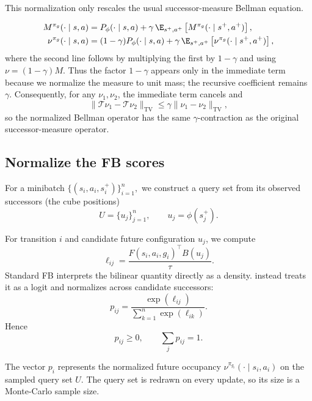 This normalization only rescales the usual successor-measure Bellman equation.

\begin{align}
    M^{\pi_g}(\cdot\mid s,a)    &= P_\phi(\cdot\mid s,a) + \gamma\,\E_{s^+,a^+} \left[ M^{\pi_g}(\cdot\mid s^+,a^+) \right], \\
    \nu^{\pi_g}(\cdot\mid s,a)  &= (1-\gamma)P_\phi(\cdot\mid s,a) + \gamma\,\E_{s^+,a^+} \left[ \nu^{\pi_g}(\cdot\mid s^+,a^+) \right],
\label{eq:normalized-bellman}
\end{align}
where the second line follows by multiplying the first by $1-\gamma$ and using $\nu=(1-\gamma)M$.
Thus the factor $1-\gamma$ appears only in the immediate term because we normalize the measure to unit mass; the recursive coefficient remains $\gamma$.
Consequently, for any $\nu_1,\nu_2$, the immediate term cancels and
\begin{equation}
    \|\mathcal T\nu_1-\mathcal T\nu_2\|_{\mathrm{TV}} \le \gamma\|\nu_1-\nu_2\|_{\mathrm{TV}},
\end{equation}
so the normalized Bellman operator has the same $\gamma$-contraction as the original successor-measure operator.

\subsection{Normalize the FB scores}

For a minibatch $\{(s_i,a_i,s_i^+)\}_{i=1}^n,$ we construct a query set from its observed successors (the cube positions)
\begin{equation}
U = \{u_j\}_{j=1}^n, \qquad u_j=\phi(s_j^+).
\end{equation}

For transition $i$ and candidate future configuration $u_j$, we compute
\begin{equation}
\ell_{ij} = \frac{ F(s_i,a_i,g_i)^\top B(u_j) }{\tau}.
\end{equation}
Standard FB interprets the bilinear quantity directly as a density.
\DensityFB{} instead treats it as a logit and normalizes across candidate successors:
\begin{equation}
\label{eq:density-softmax}
p_{ij} = \frac{ \exp(\ell_{ij}) }{ \sum_{k=1}^n \exp(\ell_{ik})}.
\end{equation}
Hence
\begin{equation}
p_{ij}\ge0, \qquad \sum_j p_{ij}=1.
\end{equation}

The vector $p_i$ represents the normalized future occupancy
$\nu^{\pi_{g_i}}(\cdot\mid s_i,a_i)$ on the sampled query set $U$.
The query set is redrawn on every update, so its size is a Monte-Carlo sample size.

